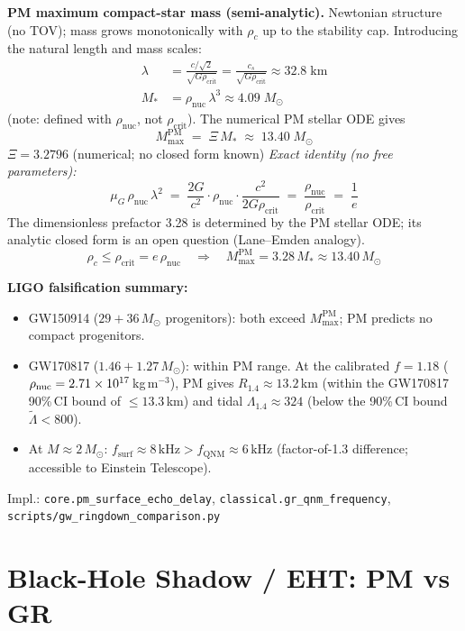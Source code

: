 \documentclass[10pt,twocolumn]{article}
\begin{document}
\textbf{PM maximum compact-star mass (semi-analytic).}
Newtonian structure (no TOV); mass grows monotonically with $\rho_c$ up
to the stability cap.  Introducing the natural length and mass scales:
\begin{align*}
  \lambda &= \frac{c/\sqrt{2}}{\sqrt{G\rho_{\mathrm{crit}}}}
  = \frac{c_s}{\sqrt{G\rho_{\mathrm{crit}}}} \approx 32.8\;\mathrm{km} \\
  M_* &= \rho_{\mathrm{nuc}}\,\lambda^3 \approx 4.09\;M_\odot
\end{align*}
(note: defined with $\rho_{\mathrm{nuc}}$, not $\rho_{\mathrm{crit}}$).  The
numerical PM stellar ODE gives
\[
  \boxed{M_{\mathrm{max}}^{\mathrm{PM}} \;=\; \Xi\,M_* \;\approx\; 13.40\;M_\odot}
\]
$\Xi = 3.2796$ (numerical; no closed form known)
\emph{Exact identity (no free parameters):}
\[
  \mu_G\,\rho_{\mathrm{nuc}}\,\lambda^2
  \;=\; \frac{2G}{c^2}\cdot\rho_{\mathrm{nuc}}\cdot\frac{c^2}{2G\rho_{\mathrm{crit}}}
  \;=\; \frac{\rho_{\mathrm{nuc}}}{\rho_{\mathrm{crit}}} \;=\; \frac{1}{e}
\]
The dimensionless prefactor 3.28 is determined by the PM stellar ODE;
its analytic closed form is an open question (Lane--Emden analogy).
\[
  \rho_c \le \rho_{\mathrm{crit}} = e\,\rho_{\mathrm{nuc}}
  \quad\Longrightarrow\quad
  M_{\mathrm{max}}^{\mathrm{PM}} = 3.28\,M_* \approx 13.40\,M_\odot
\]

\textbf{LIGO falsification summary:}
\begin{itemize}\setlength\itemsep{1pt}
  \item GW150914 ($29+36\,M_\odot$ progenitors): both exceed
        $M_{\mathrm{max}}^{\mathrm{PM}}$; PM predicts no compact progenitors.
  \item GW170817 ($1.46+1.27\,M_\odot$): within PM range.
        At the calibrated $f{=}1.18$ ($\rho_{\rm nuc}=2.71\times10^{17}$\,kg\,m$^{-3}$),
        PM gives $R_{1.4}\approx13.2$\,km (within the GW170817 90\%\,CI bound
        of $\leq13.3$\,km) and tidal $\Lambda_{1.4}\approx324$ (below the
        90\%\,CI bound $\tilde\Lambda<800$).
  \item At $M\approx2\,M_\odot$: $f_{\mathrm{surf}}\approx8\,\mathrm{kHz}
        > f_{\mathrm{QNM}}\approx6\,\mathrm{kHz}$ (factor-of-1.3 difference;
        accessible to Einstein Telescope).
\end{itemize}
Impl.: \texttt{core.pm\_surface\_echo\_delay},
\texttt{classical.gr\_qnm\_frequency},
\texttt{scripts/gw\_ringdown\_comparison.py}
\section{Black-Hole Shadow / EHT: PM vs GR}
\end{document}
